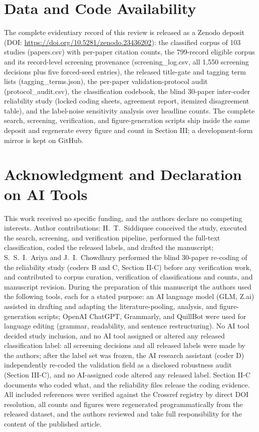 \documentclass[journal]{IEEEtran}
\begin{document}
\balance

\section*{Data and Code Availability}

The complete evidentiary record of this review is released as a Zenodo deposit (DOI: \url{https://doi.org/10.5281/zenodo.23436202}): the classified corpus of 103 studies (papers.csv) with per-paper citation counts, the 799-record eligible corpus and its record-level screening provenance (screening\_log.csv, all 1{,}550 screening decisions plus five forced-seed entries), the released title-gate and tagging term lists (tagging\_terms.json), the per-paper validation-protocol audit (protocol\_audit.csv), the classification codebook, the blind 30-paper inter-coder reliability study (locked coding sheets, agreement report, itemized disagreement table), and the label-noise sensitivity analysis over headline counts. The complete search, screening, verification, and figure-generation scripts ship inside the same deposit and regenerate every figure and count in Section III; a development-form mirror is kept on GitHub.

\section*{Acknowledgment and Declaration on AI Tools}

This work received no specific funding, and the authors declare no competing interests. Author contributions: H.~T.~Siddiquee conceived the study, executed the search, screening, and verification pipeline, performed the full-text classification, coded the released labels, and drafted the manuscript; S.~S.~I.~Ariya and J.~I.~Chowdhury performed the blind 30-paper re-coding of the reliability study (coders B and C, Section II-C) before any verification work, and contributed to corpus curation, verification of classifications and counts, and manuscript revision. During the preparation of this manuscript the authors used the following tools, each for a stated purpose: an AI language model (GLM, Z.ai) assisted in drafting and adapting the literature-pooling, analysis, and figure-generation scripts; OpenAI ChatGPT, Grammarly, and QuillBot were used for language editing (grammar, readability, and sentence restructuring). No AI tool decided study inclusion, and no AI tool assigned or altered any released classification label: all screening decisions and all released labels were made by the authors; after the label set was frozen, the AI research assistant (coder D) independently re-coded the validation field as a disclosed robustness audit (Section III-C), and no AI-assigned code altered any released label. Section II-C documents who coded what, and the reliability files release the coding evidence. All included references were verified against the Crossref registry by direct DOI resolution, all counts and figures were regenerated programmatically from the released dataset, and the authors reviewed and take full responsibility for the content of the published article.
\end{document}
